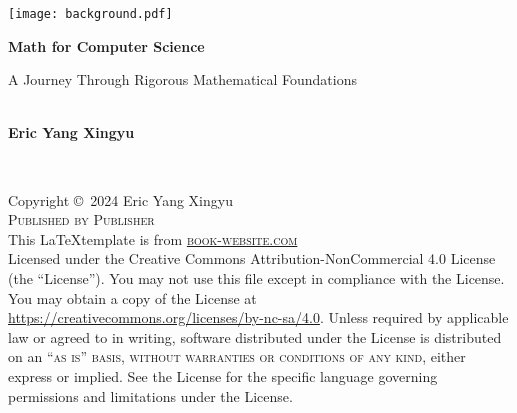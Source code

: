 \documentclass[
	12pt, %
	fleqn, %
	a4paper, %
]{LegrandOrangeBook}
\theoremstyle{lemmastyle}
\theoremstyle{solutionStyle}
\theoremstyle{axiom_style}
\begin{document}

\titlepage %
	{\texttt{[image: background.pdf]}} %
	{ %
		\centering\sffamily %
		{\Huge\bfseries Math for Computer Science\par} %
		\vspace{16pt} %
		{\LARGE A Journey Through Rigorous Mathematical Foundations} %
		\vspace{24pt} %
		{\huge\bfseries \\ Eric Yang Xingyu\par} %
	}


\thispagestyle{empty} %

~\vfill %

\noindent Copyright \copyright\ 2024 Eric Yang Xingyu\\ %

\noindent \textsc{Published by Publisher}\\ %
This \LaTeX \space template is from 
\noindent \textsc{\href{https://www.latextemplates.com/template/legrand-orange-book}{book-website.com}}\\ %

\noindent Licensed under the Creative Commons Attribution-NonCommercial 4.0 License (the ``License''). You may not use this file except in compliance with the License. You may obtain a copy of the License at \url{https://creativecommons.org/licenses/by-nc-sa/4.0}. Unless required by applicable law or agreed to in writing, software distributed under the License is distributed on an \textsc{``as is'' basis, without warranties or conditions of any kind}, either express or implied. See the License for the specific language governing permissions and limitations under the License.\\ %
\end{document}
